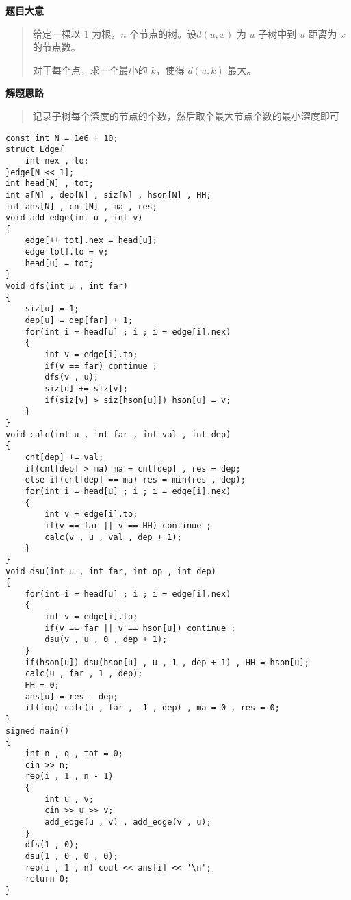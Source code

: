 \documentclass[E:/GsjzTle/main/main.tex]{subfiles}
\begin{document}
\textbf{题目大意}

\begin{quote}
给定一棵以 \(1\) 为根，\(n\) 个节点的树。设\(d(u,x)\) 为 \(u\) 子树中到
\(u\) 距离为 \(x\) 的节点数。

对于每个点，求一个最小的 \(k\)，使得 \(d(u,k)\) 最大。
\end{quote}

\textbf{解题思路}

\begin{quote}
记录子树每个深度的节点的个数，然后取个最大节点个数的最小深度即可
\end{quote}

\begin{lstlisting}
const int N = 1e6 + 10;
struct Edge{
	int nex , to;
}edge[N << 1];
int head[N] , tot;
int a[N] , dep[N] , siz[N] , hson[N] , HH;
int ans[N] , cnt[N] , ma , res;
void add_edge(int u , int v)
{
	edge[++ tot].nex = head[u];
	edge[tot].to = v;
	head[u] = tot;
}
void dfs(int u , int far)
{
	siz[u] = 1;
	dep[u] = dep[far] + 1;
	for(int i = head[u] ; i ; i = edge[i].nex)
	{
		int v = edge[i].to;
		if(v == far) continue ;		
		dfs(v , u);
		siz[u] += siz[v];
		if(siz[v] > siz[hson[u]]) hson[u] = v;
	}
} 
void calc(int u , int far , int val , int dep)
{
	cnt[dep] += val;
	if(cnt[dep] > ma) ma = cnt[dep] , res = dep;
	else if(cnt[dep] == ma) res = min(res , dep);
	for(int i = head[u] ; i ; i = edge[i].nex)
	{
		int v = edge[i].to;
		if(v == far || v == HH) continue ;
		calc(v , u , val , dep + 1);
	}
}
void dsu(int u , int far, int op , int dep)
{
	for(int i = head[u] ; i ; i = edge[i].nex)
	{
		int v = edge[i].to;
		if(v == far || v == hson[u]) continue ;
		dsu(v , u , 0 , dep + 1);
	}
	if(hson[u]) dsu(hson[u] , u , 1 , dep + 1) , HH = hson[u];
	calc(u , far , 1 , dep);
	HH = 0;
	ans[u] = res - dep;
	if(!op) calc(u , far , -1 , dep) , ma = 0 , res = 0;
}
signed main()
{
	int n , q , tot = 0;
	cin >> n;
	rep(i , 1 , n - 1)
	{
		int u , v;
		cin >> u >> v;
		add_edge(u , v) , add_edge(v , u);	
	} 
	dfs(1 , 0);
	dsu(1 , 0 , 0 , 0);
	rep(i , 1 , n) cout << ans[i] << '\n';
	return 0;
}
\end{lstlisting}
\end{document}
